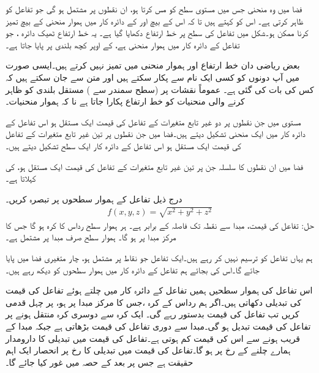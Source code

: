 فضا میں وہ منحنی جس میں  مستوی   سطح  کو مس کرتا   ہو،  ان نقطوں پر مشتمل ہو گی  جو تفاعل  کو ظاہر کرتی ہے۔ اس کو  کہتے ہیں تا کہ اس کے   بیچ  اور    کے دائرہ کار  میں ہموار منحنی کے بیچ  تمیز کرنا ممکن ہو۔شکل   میں تفاعل  کی سطح  پر  خط ارتفاع   دکھایا گیا ہے۔ یہ خط ارتفاع ٹھیک دائرہ  ، جو تفاعل کے دائرہ کار میں ہموار منحنی  ہے، کے اوپر کچھ بلندی پر پایا جاتا ہے۔

 بعض ریاضی دان  خط ارتفاع اور ہموار منحنی میں تمیز نہیں کرتے ہیں۔ایسی صورت میں آپ دونوں کو کسی ایک نام سے پکار سکتے ہیں اور متن سے جان سکتے ہیں کہ کس کی بات کی گئی ہے۔ عموماً نقشات  پر  (سطح سمندر سے )   مستقل بلندی کو ظاہر کرنے والی منحنیات کو  خط ارتفاع  پکارا جاتا ہے نا کہ ہموار منحنیات۔

مستوی میں جن نقطوں پر   دو غیر تابع  متغیرات کے  تفاعل  کی قیمت ایک مستقل  ہو اس تفاعل کے دائرہ کار میں ایک منحنی تشکیل دیتے ہیں۔فضا میں  جن نقطوں پر تین غیر تابع متغیرات کے تفاعل کی قیمت ایک مستقل   ہو  اس تفاعل کے دائرہ کار  ایک سطح تشکیل دیتے ہیں۔

فضا میں ان نقطوں    کا سلسلہ جن پر تین غیر تابع متغیرات کے تفاعل کی قیمت ایک مستقل  ہو،  کی  کہلاتا ہے۔

درج ذیل تفاعل کے ہموار سطحوں پر تبصرہ کریں۔
\begin{align*}
f(x,y,z)=\sqrt{x^2+y^2+z^2}
\end{align*}
حل:\quad
تفاعل  کی قیمت،   مبدا سے نقطہ  تک فاصلہ  کے برابر ہے۔ ہر ہموار سطح  رداس  کا کرہ ہو گا جس کا مرکز مبدا پر ہو گا۔  ہموار سطح   صرف مبدا پر مشتمل ہے۔

ہم یہاں تفاعل کو ترسیم نہیں کر رہے ہیں۔ایک تفاعل جو نقاط   پر مشتمل ہو،  چار متغیری فضا  میں پایا جائے گا۔اس کی بجائے  ہم تفاعل کے دائرہ کار میں ہموار سطحوں کو دیکھ رہے ہیں۔

 اس تفاعل کی ہموار سطحیں ہمیں   تفاعل کے دائرہ کار  میں  چلتے ہوئے تفاعل کی قیمت کی تبدیلی  دکھاتی ہیں۔اگر ہم رداس  کے کرہ ،جس کا مرکز مبدا پر ہو،   پر چہل قدمی  کریں  تب تفاعل کی قیمت بدستور  رہے گی۔ ایک کرہ سے دوسری کرہ  منتقل ہونے پر تفاعل کی قیمت تبدیل ہو گی۔مبدا سے دوری    تفاعل کی قیمت بڑھاتی ہے جبکہ مبدا کے قریب ہونے سے اس کی قیمت کم ہوتی ہے۔تفاعل کی قیمت میں تبدیلی کا دارومدار ہمارے چلنے کے رخ پر ہو گا۔تفاعل کی قیمت میں تبدیلی کا رخ پر انحصار ایک اہم حقیقت ہے جس پر بعد کے حصہ میں غور کیا جائے گا۔ 

